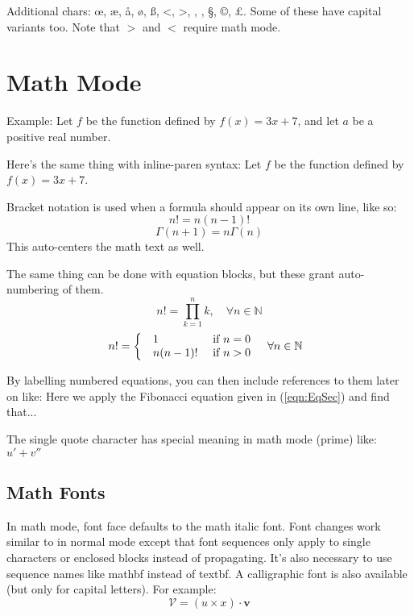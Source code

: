 \documentclass[a4paper,12pt]{article}
\begin{document}
Additional chars: \oe, \ae, \aa, \o, \ss, <, >, \dag, \ddag, \S, \copyright,
\pounds.  Some of these have capital variants too.  Note that $>$ and $<$
require math mode.

\section{Math Mode}

Example: Let $f$ be the function defined by $f(x) = 3x + 7$, and let $a$ be a
positive real number.

Here's the same thing with inline-paren syntax: Let \( f \) be the function
defined by \( f(x) = 3x + 7 \).

Bracket notation is used when a formula should appear on its own line, like so: 
\[ n! = n(n - 1)! \]
\[ \Gamma(n + 1) = n\Gamma(n) \]
This auto-centers the math text as well.

The same thing can be done with equation blocks, but these grant auto-numbering
of them.  
\begin{equation}n! = \prod_{k = 1}^nk, \quad \forall n \in
    \mathbb{N} \end {equation}
\begin{equation} 
n! = \left\{
  \begin{array}{l c}
    \begin{array}{l l}
      1 & \mbox{ if } n = 0 \\
      n(n - 1)! & \mbox{ if } n > 0 \\
    \end{array} & \forall n \in \mathbb{N} \\
  \end{array}
\right.\label{eqn:EqSec}
\end{equation}

By labelling numbered equations, you can then include references to them later
on like: Here we apply the Fibonacci equation given in (\ref{eqn:EqSec}) and
find that...

The single quote character has special meaning in math mode (prime) like: $u' +
v''$

\subsection{Math Fonts}

In math mode, font face defaults to the math italic font.  Font changes work
similar to in normal mode except that font sequences only apply to single
characters or enclosed blocks instead of propagating.  It's also necessary to
use sequence names like mathbf instead of textbf.  A calligraphic font is also
available (but only for capital letters).  For example:
\[ \mathcal{V} = (u \times x) \cdot \mathbf{v} \]
\end{document}

